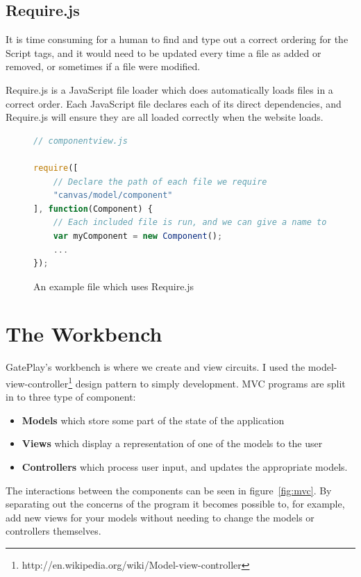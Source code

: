 \subsection{Require.js}
It is time consuming for a human to find and type out a correct ordering for the Script tags, and it would need to be updated every time a file as added or removed, or sometimes if a file were modified.

Require.js is a JavaScript file loader which does automatically loads files in a correct order. Each JavaScript file declares each of its direct dependencies, and Require.js will ensure they are all loaded correctly when the website loads.

\begin{figure}[H]
\begin{lstlisting}[language=JavaScript]
// componentview.js

require([
	// Declare the path of each file we require	
	"canvas/model/component"
], function(Component) {
	// Each included file is run, and we can give a name to whatever it returns if desired
	var myComponent = new Component();
	...
});
\end{lstlisting}
\caption{An example file which uses Require.js}
\end{figure}

\section{The Workbench}
\label{section:workbench}
GatePlay's workbench is where we create and view circuits. I used the model-view-controller\footnote{http://en.wikipedia.org/wiki/Model-view-controller} design pattern to simply development. MVC programs are split in to three type of component:

\begin{itemize}
	\item \textbf{Models} which store some part of the state of the application
	\item \textbf{Views} which display a representation of one of the models to the user
	\item \textbf{Controllers} which process user input, and updates the appropriate models.
\end{itemize}

The interactions between the components can be seen in figure~\ref{fig:mvc}. By separating out the concerns of the program it becomes possible to, for example, add new views for your models without needing to change the models or controllers themselves.

